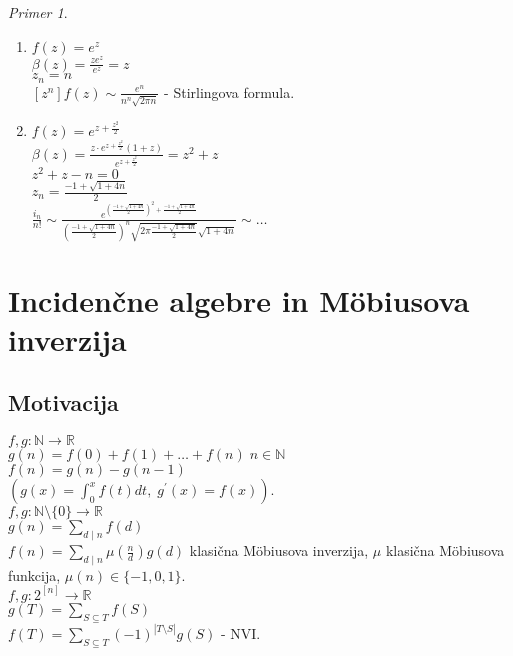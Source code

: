 \documentclass[a4paper, 12pt]{book}
\theoremstyle{definition}
\theoremstyle{remark}
\newtheorem*{ex}{Primer}
\newcommand{\N}{\mathbb{N}}
\newcommand{\R}{\mathbb{R}}
\begin{document}
\begin{ex} \text{} \\
  \begin{enumerate}[label=(\arabic*)]
    \item $f(z) = e^z$ \\
      $\beta(z) = \frac{z e^z}{e^z} = z$ \\
      $z_n = n$ \\
      $[z^n] f(z) \sim \frac{e^n}{n^n \sqrt{2 \pi n}}$ - Stirlingova formula.
    \item $f(z) = e^{z + \frac{z^2}{2}}$ \\
      $\beta(z) = \frac{z \cdot e^{z + \frac{z^2}{2}} (1 + z)}{e^{z + \frac{z^2}{2}}} = z^2 + z$ \\
      $z^2 + z - n = 0$ \\
      $z_n = \frac{-1 + \sqrt{1 + 4n}}{2}$ \\
      $\frac{i_n}{n!} \sim \frac
        {e^{\left(\frac{-1 + \sqrt{1 + 4n}}{2}\right)^2 + \frac{-1 + \sqrt{1 + 4n}}{2}}}
        {\left(\frac{-1 + \sqrt{1 + 4n}}{2}\right)^n
        \sqrt{2 \pi \frac{-1 + \sqrt{1 + 4n}}{2}} \sqrt{1 + 4n}} \sim \dots$
  \end{enumerate}
\end{ex}



\chapter{Incidenčne algebre in Möbiusova inverzija}


\section{Motivacija}

$f, g: \N \to \R$ \\
$g(n) = f(0) + f(1) + \dots + f(n) \; n \in \N$ \\
$f(n) = g(n) - g(n-1)$ \\
$(g(x) = \int_{0}^{x} f(t) dt, \; g^{'}(x) = f(x))$. \\
$f, g: \N \setminus \{0\} \to \R$ \\
$g(n) = \sum_{d \mid n} f(d)$ \\
$f(n) = \sum_{d \mid n} \mu\left(\frac{n}{d}\right) g(d)$ klasična Möbiusova inverzija,
$\mu$ klasična Möbiusova funkcija, $\mu(n) \in \{-1, 0, 1\}$. \\
$f, g: 2^{[n]} \to \R$ \\
$g(T) = \sum_{S \subseteq T} f(S)$ \\
$f(T) = \sum_{S \subseteq T} (-1)^{|T \setminus S|} g(S)$ - NVI. \\
\end{document}
